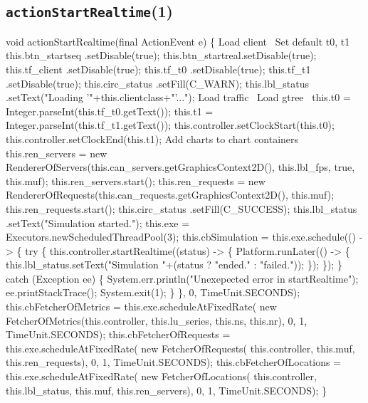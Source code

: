 \subsection{\texttt{actionStartRealtime}(1)}
\nwenddocs{}\endmoddef{}
void actionStartRealtime(final ActionEvent e) \{
  \LA{}Load client~{\nwtagstyle{}}\RA{}
  \LA{}Set default t0, t1~{\nwtagstyle{}}\RA{}
  this.btn_startseq .setDisable(true);
  this.btn_startreal.setDisable(true);
  this.tf_client     .setDisable(true);
  this.tf_t0        .setDisable(true);
  this.tf_t1        .setDisable(true);
  this.circ_status  .setFill(C_WARN);
  this.lbl_status   .setText("Loading '"+this.clientclass+"'...");
  \LA{}Load traffic~{\nwtagstyle{}}\RA{}
  \LA{}Load gtree~{\nwtagstyle{}}\RA{}
  this.t0 = Integer.parseInt(this.tf_t0.getText());
  this.t1 = Integer.parseInt(this.tf_t1.getText());
  this.controller.setClockStart(this.t0);
  this.controller.setClockEnd(this.t1);
  \LA{}Add charts to chart containers~{\nwtagstyle{}}\RA{}
  this.ren_servers = new RendererOfServers(this.can_servers.getGraphicsContext2D(), this.lbl_fps, true, this.muf);
  this.ren_servers.start();
  this.ren_requests = new RendererOfRequests(this.can_requests.getGraphicsContext2D(), this.muf);
  this.ren_requests.start();
  this.circ_status  .setFill(C_SUCCESS);
  this.lbl_status   .setText("Simulation started.");
  this.exe = Executors.newScheduledThreadPool(3);
  this.cbSimulation = this.exe.schedule(() -> \{
    try \{
      this.controller.startRealtime((status) -> \{
        Platform.runLater(() -> \{
          this.lbl_status.setText("Simulation "+(status ? "ended." : "failed."));
        \});
      \});
    \} catch (Exception ee) \{
      System.err.println("Unexepected error in startRealtime");
      ee.printStackTrace();
      System.exit(1);
    \}
  \}, 0, TimeUnit.SECONDS);
  this.cbFetcherOfMetrics = this.exe.scheduleAtFixedRate(
      new FetcherOfMetrics(this.controller, this.lu_series, this.ns, this.nr), 0, 1, TimeUnit.SECONDS);
  this.cbFetcherOfRequests = this.exe.scheduleAtFixedRate(
      new FetcherOfRequests(
        this.controller, this.muf, this.ren_requests), 0, 1, TimeUnit.SECONDS);
  this.cbFetcherOfLocations = this.exe.scheduleAtFixedRate(
      new FetcherOfLocations(
        this.controller, this.lbl_status, this.muf, this.ren_servers), 0, 1, TimeUnit.SECONDS);
\}
\eatline
{}\nwendcode{}\nwdocspar
